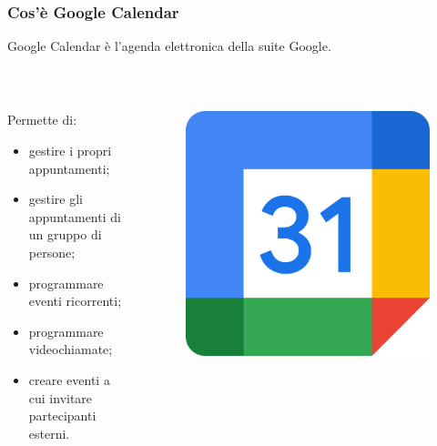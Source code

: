 \documentclass[handout]{beamer}
\begin{document}
\begin{frame}
\frametitle{Cos'è Google Calendar}
Google Calendar è l'\alert{agenda elettronica} della suite Google.\pause

~

\begin{columns}
\begin{column}{.7\textwidth}
  Permette di:
  \begin{itemize}
    \item gestire i propri appuntamenti;\pause
    \item gestire gli appuntamenti di un gruppo di persone;\pause
    \item programmare eventi ricorrenti;\pause
    \item programmare videochiamate;\pause
    \item creare eventi a cui invitare partecipanti esterni.
  \end{itemize}  
\end{column}
\begin{column}{.2\textwidth}
  \begin{figure}
    \includegraphics[width=\columnwidth]{img/calendarlogo.png}
  \end{figure}
\end{column}
\end{columns}
\end{frame}
\end{document}
